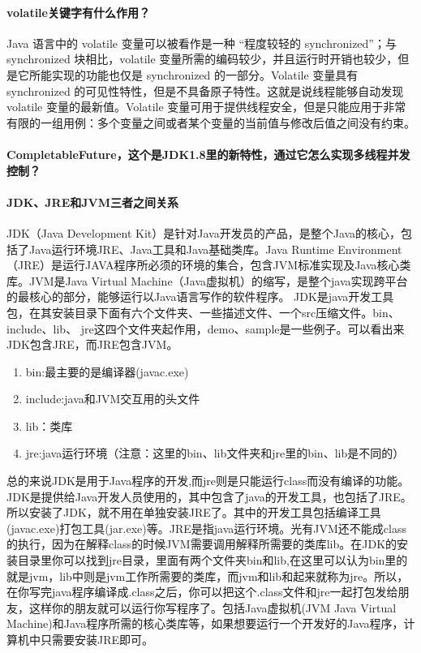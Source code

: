 \documentclass[../../../interview-questions.tex]{subfiles}
\begin{document}
\paragraph{volatile关键字有什么作用？}

Java 语言中的 volatile 变量可以被看作是一种 “程度较轻的 synchronized”；与 synchronized 块相比，volatile 变量所需的编码较少，并且运行时开销也较少，但是它所能实现的功能也仅是 synchronized 的一部分。Volatile 变量具有 synchronized 的可见性特性，但是不具备原子特性。这就是说线程能够自动发现 volatile 变量的最新值。Volatile 变量可用于提供线程安全，但是只能应用于非常有限的一组用例：多个变量之间或者某个变量的当前值与修改后值之间没有约束。


\paragraph{CompletableFuture，这个是JDK1.8里的新特性，通过它怎么实现多线程并发控制？}


\paragraph{JDK、JRE和JVM三者之间关系}

JDK（Java Development Kit）是针对Java开发员的产品，是整个Java的核心，包括了Java运行环境JRE、Java工具和Java基础类库。Java Runtime Environment（JRE）是运行JAVA程序所必须的环境的集合，包含JVM标准实现及Java核心类库。JVM是Java Virtual Machine（Java虚拟机）的缩写，是整个java实现跨平台的最核心的部分，能够运行以Java语言写作的软件程序。
JDK是java开发工具包，在其安装目录下面有六个文件夹、一些描述文件、一个src压缩文件。bin、include、lib、 jre这四个文件夹起作用，demo、sample是一些例子。可以看出来JDK包含JRE，而JRE包含JVM。

\begin{enumerate}
	\item{bin:最主要的是编译器(javac.exe)}
	\item{include:java和JVM交互用的头文件}
	\item{lib：类库}
	\item{jre:java运行环境（注意：这里的bin、lib文件夹和jre里的bin、lib是不同的）}
\end{enumerate}

总的来说JDK是用于Java程序的开发,而jre则是只能运行class而没有编译的功能。JDK是提供给Java开发人员使用的，其中包含了java的开发工具，也包括了JRE。所以安装了JDK，就不用在单独安装JRE了。其中的开发工具包括编译工具(javac.exe)打包工具(jar.exe)等。JRE是指java运行环境。光有JVM还不能成class的执行，因为在解释class的时候JVM需要调用解释所需要的类库lib。在JDK的安装目录里你可以找到jre目录，里面有两个文件夹bin和lib,在这里可以认为bin里的就是jvm，lib中则是jvm工作所需要的类库，而jvm和lib和起来就称为jre。所以，在你写完java程序编译成.class之后，你可以把这个.class文件和jre一起打包发给朋友，这样你的朋友就可以运行你写程序了。包括Java虚拟机(JVM Java Virtual Machine)和Java程序所需的核心类库等，如果想要运行一个开发好的Java程序，计算机中只需要安装JRE即可。
\end{document}
